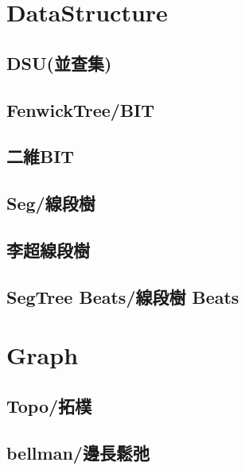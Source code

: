 \documentclass[a4paper,10pt,twocolumn,oneside]{article}
\begin{document}

\section{DataStructure}
    \subsection{DSU(並查集)}
    
    
    \subsection{FenwickTree/BIT}
    

    \subsection{二維BIT}
    

    \subsection{Seg/線段樹}
    

    \subsection{李超線段樹}
    

    \subsection{SegTree Beats/線段樹 Beats}
    


\section{Graph}

    \subsection{Topo/拓樸}
    

    \subsection{bellman/邊長鬆弛}
    
\end{document}
